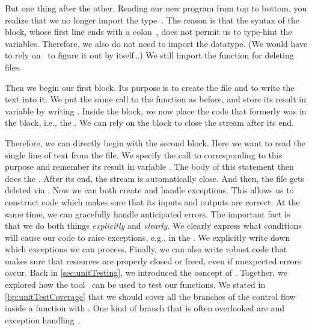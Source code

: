 But one thing after the other.
Reading our new program from top to bottom, you realize that we no longer import the type~.
The reason is that the syntax of the  block, whose first line ends with a colon~\pythonilIdx{:}, does not permit us to type-hint the variables.
Therefore, we also do not need to import the datatype.
(We would have to rely on \mypy\ to figure it out by itself\dots)
We still import the function  for deleting files.

Then we begin our first  block.
Its purpose is to create the file and to write the text into it.
We put the same call to the  function as before, and store its result in variable  by writing .
Inside the  block, we now place the code that formerly was in the  block, i.e., the .
We can rely on the  block to close the stream after its end.

Therefore, we can directly begin with the second  block.
Here we want to read the single line of text from the file.
We specify the call to  corresponding to this purpose and remember its result in variable .
The body of this  statement then does the .
After its end, the stream is automatically close.
And then, the file gets deleted via .%
%
\FloatBarrier%
\endhsection%
%
%
Now we can both create and handle exceptions.
This allows us to construct code which makes sure that its inputs and outputs are correct.
At the same time, we can gracefully handle anticipated errors.
The important fact is that we do both things \emph{explicitly} and \emph{clearly}.
We clearly express what conditions will cause our code to raise exceptions, e.g., in the .
We explicitly write down which exceptions we can process.
Finally, we can also write robust code that makes sure that resources are properly closed or freed, even if unexpected errors occur.%
\endhsection%
\endhsection%
%
%
%
\label{sec:testingExceptions}%
%
Back in \cref{sec:unitTesting}, we introduced the concept of .
Together, we explored how the tool \pytest\ can be used to test our functions.
We stated in \cref{bp:unitTestCoverage} that we should cover all the branches of the control flow inside a function with .
One kind of branch that is often overlooked are  and exception handling~\cite{LRBP2021AEHTPIOSL}.

